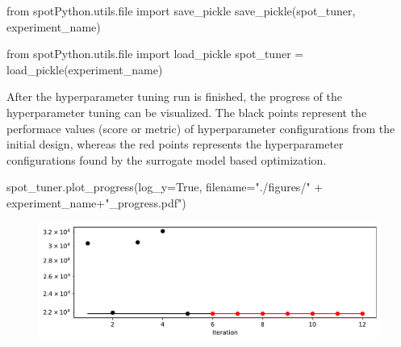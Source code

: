 \documentclass[
  letterpaper,
  DIV=11,
  numbers=noendperiod]{scrreprt}
\newenvironment{Shaded}{\begin{snugshade}}{\end{snugshade}}
\newcommand{\BuiltInTok}[1]{\textcolor[rgb]{0.00,0.23,0.31}{#1}}
\newcommand{\ImportTok}[1]{\textcolor[rgb]{0.00,0.46,0.62}{#1}}
\newcommand{\NormalTok}[1]{\textcolor[rgb]{0.00,0.23,0.31}{#1}}
\newcommand{\OperatorTok}[1]{\textcolor[rgb]{0.37,0.37,0.37}{#1}}
\newcommand{\StringTok}[1]{\textcolor[rgb]{0.13,0.47,0.30}{#1}}
\newcommand{\VariableTok}[1]{\textcolor[rgb]{0.07,0.07,0.07}{#1}}
\begin{document}
\begin{Shaded}
\begin{Highlighting}[]
\ImportTok{from}\NormalTok{ spotPython.utils.}\BuiltInTok{file} \ImportTok{import}\NormalTok{ save\_pickle}
\NormalTok{save\_pickle(spot\_tuner, experiment\_name)}
\end{Highlighting}
\end{Shaded}

\begin{Shaded}
\begin{Highlighting}[]
\ImportTok{from}\NormalTok{ spotPython.utils.}\BuiltInTok{file} \ImportTok{import}\NormalTok{ load\_pickle}
\NormalTok{spot\_tuner }\OperatorTok{=}\NormalTok{ load\_pickle(experiment\_name)}
\end{Highlighting}
\end{Shaded}

After the hyperparameter tuning run is finished, the progress of the
hyperparameter tuning can be visualized. The black points represent the
performace values (score or metric) of hyperparameter configurations
from the initial design, whereas the red points represents the
hyperparameter configurations found by the surrogate model based
optimization.

\begin{Shaded}
\begin{Highlighting}[]
\NormalTok{spot\_tuner.plot\_progress(log\_y}\OperatorTok{=}\VariableTok{True}\NormalTok{, filename}\OperatorTok{=}\StringTok{"./figures/"} \OperatorTok{+}\NormalTok{ experiment\_name}\OperatorTok{+}\StringTok{"\_progress.pdf"}\NormalTok{)}
\end{Highlighting}
\end{Shaded}

\begin{figure}[H]

{\centering \includegraphics{024_spot_hpt_river_friedman_hatr_files/figure-pdf/cell-21-output-1.pdf}

}

\end{figure}
\end{document}
